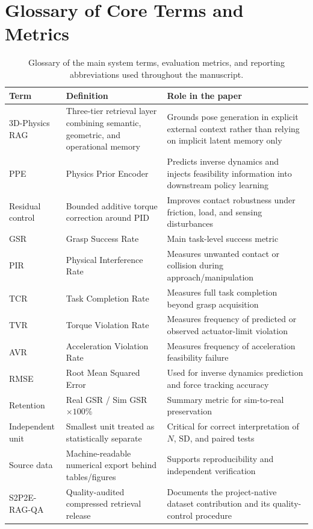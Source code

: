 \documentclass[12pt]{article}
\begin{document}
\section*{Glossary of Core Terms and Metrics}

\begin{table}[!htbp]
\centering
\caption{Glossary of the main system terms, evaluation metrics, and reporting abbreviations used throughout the manuscript.}
\label{tab:glossary}
\small\setlength{\tabcolsep}{4pt}
\begin{tabular}{@{}L{0.18\textwidth} L{0.27\textwidth} L{0.45\textwidth}@{}}
\toprule
Term & Definition & Role in the paper \\
\midrule
3D-Physics RAG & Three-tier retrieval layer combining semantic, geometric, and operational memory & Grounds pose generation in explicit external context rather than relying on implicit latent memory only \\
PPE & Physics Prior Encoder & Predicts inverse dynamics and injects feasibility information into downstream policy learning \\
Residual control & Bounded additive torque correction around PID & Improves contact robustness under friction, load, and sensing disturbances \\
GSR & Grasp Success Rate & Main task-level success metric \\
PIR & Physical Interference Rate & Measures unwanted contact or collision during approach/manipulation \\
TCR & Task Completion Rate & Measures full task completion beyond grasp acquisition \\
TVR & Torque Violation Rate & Measures frequency of predicted or observed actuator-limit violation \\
AVR & Acceleration Violation Rate & Measures frequency of acceleration feasibility failure \\
RMSE & Root Mean Squared Error & Used for inverse dynamics prediction and force tracking accuracy \\
Retention & Real GSR / Sim GSR $\times 100\%$ & Summary metric for sim-to-real preservation \\
Independent unit & Smallest unit treated as statistically separate & Critical for correct interpretation of $N$, SD, and paired tests \\
Source data & Machine-readable numerical export behind tables/figures & Supports reproducibility and independent verification \\
S2P2E-RAG-QA & Quality-audited compressed retrieval release & Documents the project-native dataset contribution and its quality-control procedure \\
\bottomrule
\end{tabular}
\end{table}
\end{document}
